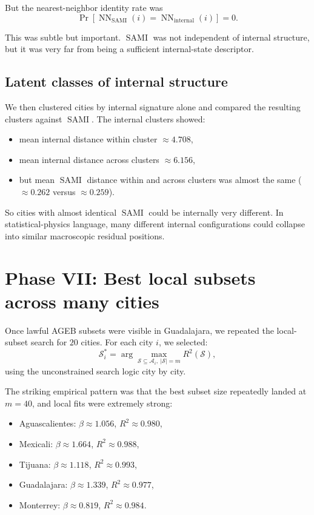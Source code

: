 \documentclass[11pt]{article}
\newcommand{\SAMI}{\operatorname{SAMI}}
\begin{document}
But the nearest-neighbor identity rate was
\begin{equation}
\Pr\!\left[
\operatorname{NN}_{\SAMI}(i)=\operatorname{NN}_{\mathrm{internal}}(i)
\right]
= 0.
\end{equation}

This was subtle but important. \(\SAMI\) was not independent of internal structure, but it was very far from being a sufficient internal-state descriptor.

\subsection{Latent classes of internal structure}

We then clustered cities by internal signature alone and compared the resulting clusters against \(\SAMI\). The internal clusters showed:
\begin{itemize}
\item mean internal distance within cluster \(\approx 4.708\),
\item mean internal distance across clusters \(\approx 6.156\),
\item but mean \(\SAMI\) distance within and across clusters was almost the same (\(\approx 0.262\) versus \(\approx 0.259\)).
\end{itemize}

So cities with almost identical \(\SAMI\) could be internally very different. In statistical-physics language, many different internal configurations could collapse into similar macroscopic residual positions.

\section{Phase VII: Best local subsets across many cities}

Once lawful AGEB subsets were visible in Guadalajara, we repeated the local-subset search for \(20\) cities. For each city \(i\), we selected:
\begin{equation}
\mathcal{S}_i^\ast
=
\arg\max_{\mathcal{S}\subseteq \mathcal{A}_i,\ |\mathcal{S}|=m}
R^2(\mathcal{S}),
\end{equation}
using the unconstrained search logic city by city.

The striking empirical pattern was that the best subset size repeatedly landed at \(m=40\), and local fits were extremely strong:
\begin{itemize}
\item Aguascalientes: \(\beta \approx 1.056\), \(R^2 \approx 0.980\),
\item Mexicali: \(\beta \approx 1.664\), \(R^2 \approx 0.988\),
\item Tijuana: \(\beta \approx 1.118\), \(R^2 \approx 0.993\),
\item Guadalajara: \(\beta \approx 1.339\), \(R^2 \approx 0.977\),
\item Monterrey: \(\beta \approx 0.819\), \(R^2 \approx 0.984\).
\end{itemize}
\end{document}
